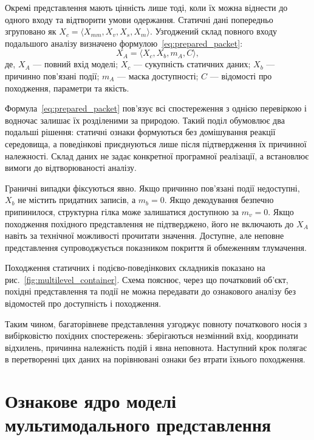 Окремі представлення мають цінність лише тоді, коли їх можна віднести до одного входу та відтворити умови одержання. Статичні дані попередньо згруповано як $X_c=\langle X_{mm},X_v,X_s,X_m\rangle$. Узгоджений склад повного входу подальшого аналізу визначено формулою~\eqref{eq:prepared_packet}:
\begin{equation}
X_A=\langle X_c,X_b,m_A,C\rangle,
\label{eq:prepared_packet}
\end{equation}
де, $X_A$ --- повний вхід моделі; $X_c$ --- сукупність статичних даних; $X_b$ --- причинно пов’язані події; $m_A$ --- маска доступності; $C$ --- відомості про походження, параметри та якість.

Формула~\eqref{eq:prepared_packet} пов’язує всі спостереження з однією перевіркою і водночас залишає їх розділеними за природою. Такий поділ обумовлює два подальші рішення: статичні ознаки формуються без домішування реакції середовища, а поведінкові приєднуються лише після підтвердження їх причинної належності. Склад даних не задає конкретної програмної реалізації, а встановлює вимоги до відтворюваності аналізу.

Граничні випадки фіксуються явно. Якщо причинно пов’язані події недоступні, $X_b$ не містить придатних записів, а $m_b=0$. Якщо декодування безпечно припинилося, структурна гілка може залишатися доступною за $m_v=0$. Якщо походження похідного представлення не підтверджено, його не включають до $X_A$ навіть за технічної можливості прочитати значення. Доступне, але неповне представлення супроводжується показником покриття й обмеженням тлумачення.

Походження статичних і подієво-поведінкових складників показано на рис.~\ref{fig:multilevel_container}. Схема пояснює, через що початковий об’єкт, похідні представлення та події не можна передавати до ознакового аналізу без відомостей про доступність і походження.



Таким чином, багаторівневе представлення узгоджує повноту початкового носія з вибірковістю похідних спостережень: зберігаються незмінний вхід, координати відхилень, причинна належність подій і явна неповнота. Наступний крок полягає в перетворенні цих даних на порівнювані ознаки без втрати їхнього походження.

\section{Ознакове ядро моделі мультимодального представлення}
\label{sec:feature_space}

